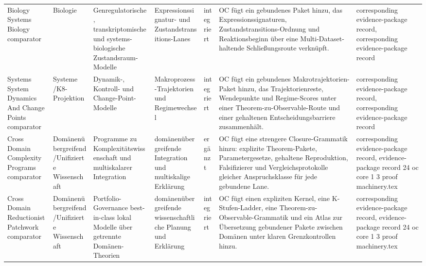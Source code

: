 \begin{longtable}{@{}L{0.14\textwidth}L{0.09\textwidth}L{0.14\textwidth}L{0.12\textwidth}L{0.10\textwidth}L{0.18\textwidth}L{0.15\textwidth}@{}}
Biology Systems Biology comparator & Biologie & Genregulatorische, transkriptomische und systems-biologische Zustandsraum-Modelle & Expressionssignatur- und Zustandstransitions-Lanes & integriert & OC fügt ein gebundenes Paket hinzu, das Expressionssignaturen, Zustandstransitions-Ordnung und Reaktionsbeginn über eine Multi-Dataset-haltende Schließungsroute verknüpft. & corresponding evidence-package record, corresponding evidence-package record \\
Systems System Dynamics And Change Points comparator & Systeme /\allowbreak K8-Projektion & Dynamik-, Kontroll- und Change-Point-Modelle & Makroprozess-Trajektorien und Regimewechsel & integriert & OC fügt ein gebundenes Makrotrajektorien-Paket hinzu, das Trajektorienreste, Wendepunkte und Regime-Scores unter einer Theorem-zu-Observable-Route und einer gehaltenen Entscheidungsbarriere zusammenhält. & corresponding evidence-package record, corresponding evidence-package record \\
Cross Domain Complexity Programs comparator & Domänenübergreifend /\allowbreak Unifizierte Wissenschaft & Programme zu Komplexitätswissenschaft und multiskalarer Integration & domänenübergreifende Integration und multiskalige Erklärung & ergänzt & OC fügt eine strengere Closure-Grammatik hinzu: explizite Theorem-Pakete, Parametergesetze, gehaltene Reproduktion, Falsifizierer und Vergleichsprotokolle gleicher Anspruchsklasse für jede gebundene Lane. & corresponding evidence-package record, \allowbreak evidence-package record 24 oc core 1 3 proof machinery.tex \\
Cross Domain Reductionist Patchwork comparator & Domänenübergreifend /\allowbreak Unifizierte Wissenschaft & Portfolio-Governance best-in-class lokal Modelle über getrennte Domänen-Theorien & domänenübergreifende wissenschaftliche Planung und Erklärung & integriert & OC fügt einen expliziten Kernel, eine K-Stufen-Ladder, eine Theorem-zu-Observable-Grammatik und ein Atlas zur Übersetzung gebundener Pakete zwischen Domänen unter klaren Grenzkontrollen hinzu. & corresponding evidence-package record, \allowbreak evidence-package record 24 oc core 1 3 proof machinery.tex \\
\bottomrule
\end{longtable}
\endgroup

